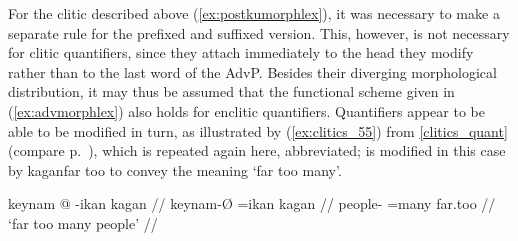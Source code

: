 For the clitic  described above (\ref{ex:postkumorphlex}),
it was necessary to make a separate rule for the prefixed and suffixed version.
This, however, is not necessary for clitic quantifiers, since they attach
immediately to the head they modify rather than to the last word of the AdvP.
Besides their diverging morphological distribution, it may thus be assumed that
the functional scheme given in (\ref{ex:advmorphlex}) also holds for enclitic
quantifiers. Quantifiers appear to be able to be modified in turn, as
illustrated by (\ref{ex:clitics_55}) from \autoref{clitics_quant} (compare
p.~\pageref{ex:clitics_55}), which is repeated again here, abbreviated; 
 is modified in this case by 
{kagan}{far too} to convey the meaning `far too many'.

\ex\label{ex:clitics_55_short}%
\begingl
	\gla keynam @ -ikan kagan //
	\glb keynam-Ø =ikan kagan //
	\glc people-\Top{} =many far.too //
	\glft `far too many people' //
\endgl~\\



\xe

